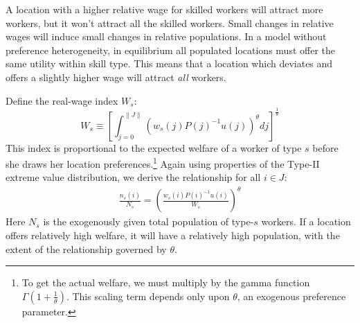 \documentclass{article}
\begin{document}
A location with a higher relative wage for skilled workers will attract more workers, but it won't attract all the skilled workers.  Small changes in relative wages will induce small changes in relative populations.  In a model without preference heterogeneity, in equilibrium all populated locations must offer the same utility within skill type.  This means that a location which deviates and offers a slightly higher wage will attract \emph{all} workers.

Define the real-wage index $W_s$:
\begin{equation*}
    W_s \equiv \left[\int_{j=0}^{\|J\|}\left(w_s(j) P(j)^{-1} u(j)\right)^\theta dj\right]^{\frac{1}{\theta}}
\end{equation*}
This index is proportional to the expected welfare of a worker of type $s$ before she draws her location preferences.\footnote{To get the actual welfare, we must multiply by the gamma function $\Gamma(1 +\frac{1}{\theta})$.  This scaling term depends only upon $\theta$, an exogenous preference parameter.}  Again using properties of the Type-II extreme value distribution, we derive the relationship for all $i \in J$:
\begin{eqnarray}\label{eq:indiff}
    \frac{n_s(i)}{N_s} = \left(\frac{w_s(i) P(i)^{-1} u(i)}{W_s}\right)^{\theta}
\end{eqnarray}
Here $N_s$ is the exogenously given total population of type-$s$ workers. If a location offers relatively high welfare, it will have a relatively high population, with the extent of the relationship governed by $\theta$.
\end{document}
